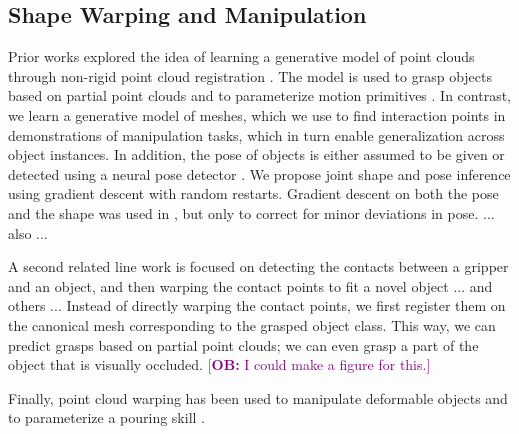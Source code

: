 \documentclass{article}
\newcommand{\ob}[1]{\textcolor{purple}{[\textbf{OB:} #1]}}
\begin{document}
\subsection{Shape Warping and Manipulation}

Prior works explored the idea of learning a generative model of point clouds through non-rigid point cloud registration \cite{rodriguez18transferring,rodriguez18transferringa,klamt18supervised,thompson21shapebased}. The model is used to grasp objects based on partial point clouds \cite{rodriguez18transferring,rodriguez18transferringa,klamt18supervised} and to parameterize motion primitives \cite{thompson21shapebased}. In contrast, we learn a generative model of meshes, which we use to find interaction points in demonstrations of manipulation tasks, which in turn enable generalization across object instances. In addition, the pose of objects is either assumed to be given \cite{thompson21shapebased} or detected using a neural pose detector \cite{klamt18supervised}. We propose joint shape and pose inference using gradient descent with random restarts. Gradient descent on both the pose and the shape was used in \cite{rodriguez18transferring,rodriguez18transferringa}, but only to correct for minor deviations in pose. ... also \cite{simeonov20long,you21omnihang,menon22viewpoint,lu22online,wen22you,cong23comprehensive} ...

A second related line work is focused on detecting the contacts between a gripper and an object, and then warping the contact points to fit a novel object \cite{li07datadriven,benamor12generalization,hillenbrand12transferring,jakel12learning,stouraitis15functional,rodriguez18learning,pavlichenko19autonomous,tian19transferring} ... and others ... Instead of directly warping the contact points, we first register them on the canonical mesh corresponding to the grasped object class. This way, we can predict grasps based on partial point clouds; we can even grasp a part of the object that is visually occluded. \ob{I could make a figure for this.}

Finally, point cloud warping has been used to manipulate deformable objects \cite{lee15learning,schulman16learning} and to parameterize a pouring skill \cite{brandi14generalizing}.


\end{document}

